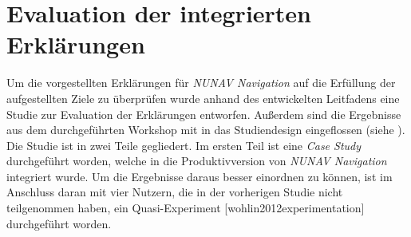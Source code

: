 \section{Evaluation der integrierten Erklärungen}

Um die vorgestellten Erklärungen für \textit{NUNAV Navigation} auf die Erfüllung der aufgestellten Ziele zu überprüfen wurde anhand des entwickelten Leitfadens eine Studie zur Evaluation der Erklärungen entworfen. Außerdem sind die Ergebnisse aus dem durchgeführten Workshop mit in das Studiendesign eingeflossen (siehe ). Die Studie ist in zwei Teile gegliedert. Im ersten Teil ist eine \textit{Case Study} \cite{wohlin2012experimentation} durchgeführt worden, welche in die Produktivversion von \textit{NUNAV Navigation} integriert wurde. Um die Ergebnisse daraus besser einordnen zu können, ist im Anschluss daran mit vier Nutzern, die in der vorherigen Studie nicht teilgenommen haben, ein Quasi-Experiment [wohlin2012experimentation] durchgeführt worden.







